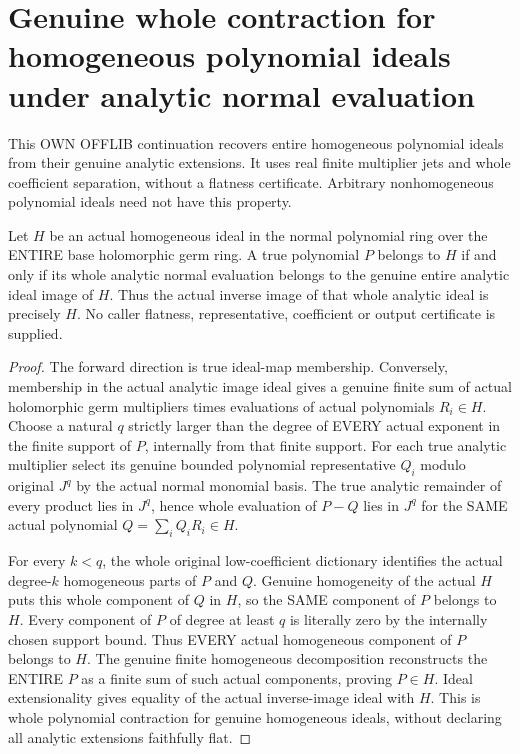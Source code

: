 \section{Genuine whole contraction for homogeneous polynomial ideals under analytic normal evaluation}
This OWN OFFLIB continuation recovers entire homogeneous polynomial ideals from their genuine analytic extensions. It uses real finite multiplier jets and whole coefficient separation, without a flatness certificate. Arbitrary nonhomogeneous polynomial ideals need not have this property.

\begin{theorem}
\label{hir:relative-normal-homogeneous-whole-analytic-contraction}
\leanok
Let $H$ be an actual homogeneous ideal in the normal polynomial ring over the ENTIRE base holomorphic germ ring. A true polynomial $P$ belongs to $H$ if and only if its whole analytic normal evaluation belongs to the genuine entire analytic ideal image of $H$. Thus the actual inverse image of that whole analytic ideal is precisely $H$. No caller flatness, representative, coefficient or output certificate is supplied.
\end{theorem}
\begin{proof}
The forward direction is true ideal-map membership. Conversely, membership in the actual analytic image ideal gives a genuine finite sum of actual holomorphic germ multipliers times evaluations of actual polynomials $R_i\in H$. Choose a natural $q$ strictly larger than the degree of EVERY actual exponent in the finite support of $P$, internally from that finite support. For each true analytic multiplier select its genuine bounded polynomial representative $Q_i$ modulo original $J^q$ by the actual normal monomial basis. The true analytic remainder of every product lies in $J^q$, hence whole evaluation of $P-Q$ lies in $J^q$ for the SAME actual polynomial $Q=\sum_i Q_iR_i\in H$.

For every $k<q$, the whole original low-coefficient dictionary identifies the actual degree-$k$ homogeneous parts of $P$ and $Q$. Genuine homogeneity of the actual $H$ puts this whole component of $Q$ in $H$, so the SAME component of $P$ belongs to $H$. Every component of $P$ of degree at least $q$ is literally zero by the internally chosen support bound. Thus EVERY actual homogeneous component of $P$ belongs to $H$. The genuine finite homogeneous decomposition reconstructs the ENTIRE $P$ as a finite sum of such actual components, proving $P\in H$. Ideal extensionality gives equality of the actual inverse-image ideal with $H$. This is whole polynomial contraction for genuine homogeneous ideals, without declaring all analytic extensions faithfully flat.
\end{proof}

